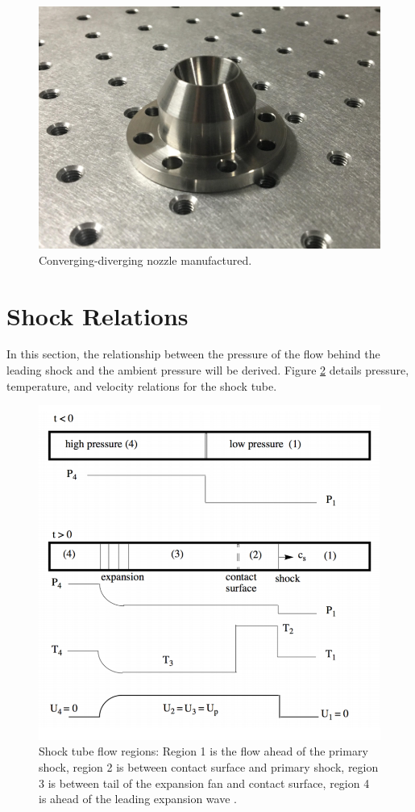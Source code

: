 \begin{figure}[H] 
	\centering
	\includegraphics[scale=1.3]{fig13.PNG} 
	\caption{Converging-diverging nozzle manufactured.}
	\label{fig:13}
\end{figure}

\section{Shock Relations} \label{app:shock}
In this section, the relationship between the pressure of the flow behind the leading shock and the ambient pressure will be derived. Figure \ref{fig:shock} details pressure, temperature, and velocity relations for the shock tube.

\begin{figure}[H]
	\centering
	\includegraphics[scale=0.5]{figshock.png} 
	\caption{Shock tube flow regions: Region 1 is the flow ahead of the primary shock, region 2 is between contact surface and primary shock, region 3 is between tail of the expansion fan and contact surface, region 4 is ahead of the leading expansion wave \cite{cantwell2017}.}
	\label{fig:shock}
\end{figure}

